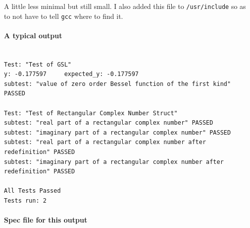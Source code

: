 \documentclass[12pt,]{book}
\let\oldparagraph\paragraph
\renewcommand{\paragraph}[1]{\oldparagraph{#1}\mbox{}}
\begin{document}
A little less minimal but still small. I also added this file to
\texttt{/usr/include} so as to not have to tell \texttt{gcc} where to
find it.

\paragraph{A typical output}

\begin{verbatim}

Test: "Test of GSL"
y: -0.177597     expected_y: -0.177597
subtest: "value of zero order Bessel function of the first kind" PASSED

Test: "Test of Rectangular Complex Number Struct"
subtest: "real part of a rectangular complex number" PASSED
subtest: "imaginary part of a rectangular complex number" PASSED
subtest: "real part of a rectangular complex number after redefinition" PASSED
subtest: "imaginary part of a rectangular complex number after redefinition" PASSED

All Tests Passed
Tests run: 2
\end{verbatim}

\paragraph{Spec file for this output}
\end{document}
